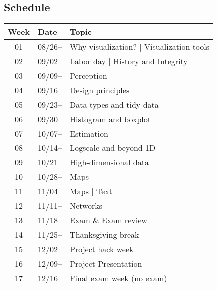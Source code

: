 \subsection{Schedule}\label{sub:schedule}%

\begin{tabular}{@{}cll@{}} \toprule
  Week & Date   & Topic \\\midrule
  01 & 08/26--  & Why visualization? | Visualization tools \\
  02 & 09/02--  & Labor day | History and Integrity \\
  03 & 09/09--  & Perception \\
  04 & 09/16--  & Design principles \\
  05 & 09/23--  & Data types and tidy data \\
  06 & 09/30--  & Histogram and boxplot \\
  07 & 10/07--  & Estimation \\
  08 & 10/14--  & Logscale and beyond 1D \\
  09 & 10/21--  & High-dimensional data \\
  10 & 10/28--  & Maps \\
  11 & 11/04--  & Maps | Text \\
  12 & 11/11--  & Networks \\
  13 & 11/18--  & Exam \& Exam review\\
  14 & 11/25--  & Thanksgiving break \\
  15 & 12/02--  & Project hack week \\
  16 & 12/09--  & Project Presentation \\
  17 & 12/16--  & Final exam week (no exam) \\
  \bottomrule
\end{tabular}

